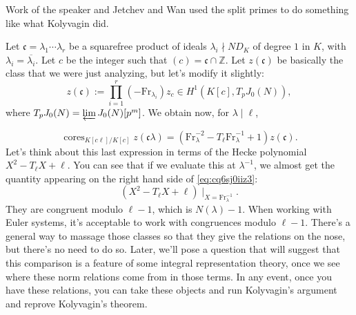 \documentclass[reqno]{amsart} 
\numberwithin{theorem}{section}
\numberwithin{equation}{section}
\numberwithin{exercise}{section}
\begin{document}
Work of the speaker and Jetchev and Wan used the split primes to do something like what Kolyvagin did.

Let $\mathfrak{c} = \lambda_1 \dotsb \lambda_r$ be a squarefree product of ideals $\lambda_i \nmid N D_K$ of degree $1$ in $K$, with $\lambda_i =\overline{\lambda_i}$.  Let $c$ be the integer such that $(c) = \mathfrak{c} \cap \mathbb{Z}$.  Let $z(\mathfrak{c})$ be basically the class that we were just analyzing, but let's modify it slightly:
\begin{equation}\label{eq:cq6sj3hg5b}
  z(\mathfrak{c}) := \prod_{i = 1}^r \left( - \mathrm{Fr}_{\lambda_i} \right) z_c \in H^1(K[c], T_p J_0(N)),
\end{equation}
where $T_p J_0(N) = \varprojlim J_0(N)[p^m]$.  We obtain now, for $\lambda \mid \ell$,

\begin{equation}\label{eq:cq6sj0iiz3}
  \operatorname{cores}_{K[c \ell] / K[c]} z(\mathfrak{c} \lambda) = \left( \mathrm{Fr}_\lambda^{- 2} - T_{\ell} \mathrm{Fr}_\lambda^{-1} + 1 \right) z(\mathfrak{c}).
\end{equation}
Let's think about this last expression in terms of the Hecke polynomial $X^2 - T_{\ell} X + \ell$.  You can see that if we evaluate this at $\lambda^{-1}$, we almost get the quantity appearing on the right hand side of \eqref{eq:cq6sj0iiz3}:
\begin{equation*}
  (X^2 - T_{\ell} X + \ell) \mid_{X = \mathrm{Fr}_\lambda^{-1}}.
\end{equation*}
They are congruent modulo $\ell - 1$, which is $N(\lambda) - 1$.  When working with Euler systems, it's acceptable to work with congruences modulo $\ell - 1$.  There's a general way to massage those classes so that they give the relations on the nose, but there's no need to do so.  Later, we'll pose a question that will suggest that this comparison is a feature of some integral representation theory, once we see where these norm relations come from in those terms.  In any event, once you have these relations, you can take these objects and run Kolyvagin's argument and reprove Kolyvagin's theorem.
\end{document}
